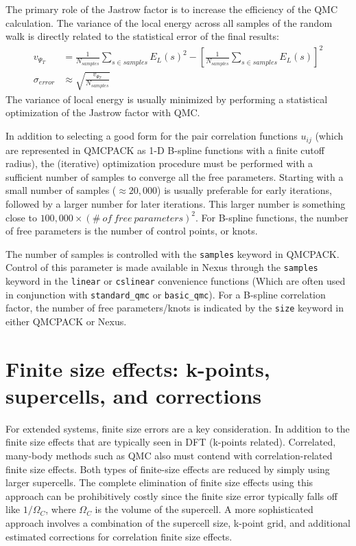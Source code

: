 \documentclass[oneside,11pt]{memoir}
\numberwithin{equation}{section}
\begin{document}
The primary role of the Jastrow factor is to increase the efficiency of the 
QMC calculation.  The variance of the local energy across all samples of the 
random walk is directly related to the statistical error of the final results: 
\begin{align}
  v_{\Psi_T} &= \frac{1}{N_{samples}}\sum_{s\in samples} E_L(s)^2 - \left[\frac{1}{N_{samples}}\sum_{s\in samples} E_L(s)\right]^2 \\
  \sigma_{error} &\approx \sqrt{\frac{v_{\Psi_T}}{N_{samples}}}
\end{align}
The variance of local energy is usually minimized by performing a statistical 
optimization of the Jastrow factor with QMC.  

In addition to selecting a good 
form for the pair correlation functions $u_{ij}$ (which are represented in 
QMCPACK as 1-D B-spline functions with a finite cutoff radius), the 
(iterative) optimization procedure must be performed with a sufficient number 
of samples to converge all the free parameters.  Starting with a small number 
of samples ($\approx 20,000$) is usually preferable for early iterations, 
followed by a larger number for later iterations.  This larger number is 
something close to $100,000\times (\#~of~free~parameters)^2$.  For B-spline 
functions, the number of free parameters is the number of control points, or knots.

The number of samples is controlled with the \texttt{samples} keyword in 
QMCPACK.  Control of this parameter is made available in Nexus 
through the \texttt{samples} keyword in the \texttt{linear} or 
\texttt{cslinear} convenience functions (Which are often used in conjunction 
with \texttt{standard\_qmc} or \texttt{basic\_qmc}).  For a B-spline 
correlation factor, the number of free parameters/knots is indicated by the 
\texttt{size} keyword in either QMCPACK or Nexus.


\section{Finite size effects: k-points, supercells, and corrections}
For extended systems, finite size errors are a key consideration.  In addition 
to the finite size effects that are typically seen in DFT (k-points related).  
Correlated, many-body methods such as QMC also must contend with 
correlation-related finite size effects.  Both types of finite-size effects 
are reduced by simply using larger supercells.  The complete 
elimination of finite size effects using this approach can be prohibitively 
costly since the finite size error typically falls off like $1/\Omega_C$, where 
$\Omega_C$ is the volume of the supercell.  A more sophisticated approach 
involves a combination of the supercell size, k-point grid, and additional 
estimated corrections for correlation finite size effects.
\end{document}
